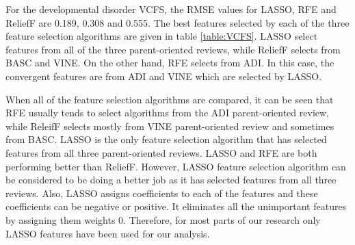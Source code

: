 For the developmental disorder VCFS, the RMSE values for LASSO, RFE and ReliefF are 0.189, 0.308 and 0.555. The best features selected by each of the three feature selection algorithms are given in table \ref{table:VCFS}. LASSO select features from all of the three parent-oriented reviews, while ReliefF selects from BASC and VINE. On the other hand, RFE selects from ADI. In this case, the convergent features are from ADI and VINE which are selected by LASSO.

When all of the feature selection algorithms are compared, it can be seen that RFE usually tends to select algorithms from the ADI parent-oriented review, while ReleifF selects mostly from VINE parent-oriented review and sometimes from BASC. LASSO is the only feature selection algorithm that has selected features from all three parent-oriented reviews. LASSO and RFE are both performing better than ReliefF. However, LASSO feature selection algorithm can be considered to be doing a better job as it has selected features from all three reviews. Also, LASSO assigns coefficients to each of the features and these coefficients can be negative or positive. It eliminates all the unimportant features by assigning them weights 0. Therefore, for most parts of our research only LASSO features have been used for our analysis.
